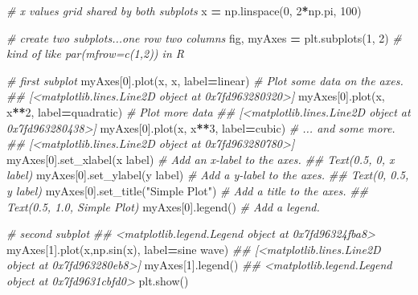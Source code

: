 \documentclass[
  12pt,
  krantz2]{krantz}
\makeatletter
\newenvironment{Shaded}{\begin{snugshade}}{\end{snugshade}}
\newcommand{\CommentTok}[1]{\textcolor[rgb]{0.37,0.37,0.37}{\textit{#1}}}
\newcommand{\DecValTok}[1]{\textcolor[rgb]{0.06,0.06,0.06}{#1}}
\newcommand{\NormalTok}[1]{#1}
\newcommand{\OperatorTok}[1]{\textcolor[rgb]{0.43,0.43,0.43}{\textbf{#1}}}
\newcommand{\StringTok}[1]{\textcolor[rgb]{0.5,0.5,0.5}{#1}}
\newenvironment{kframe}{%
\medskip{}
\setlength{\fboxsep}{.8em}
 \def\at@end@of@kframe{}%
 \ifinner\ifhmode%
  \def\at@end@of@kframe{\end{minipage}}%
  \begin{minipage}{\columnwidth}%
 \fi\fi%
 \def\FrameCommand##1{\hskip\@totalleftmargin \hskip-\fboxsep
 \colorbox{shadecolor}{##1}\hskip-\fboxsep
     \hskip-\linewidth \hskip-\@totalleftmargin \hskip\columnwidth}%
 \MakeFramed {\advance\hsize-\width
   \@totalleftmargin\z@ \linewidth\hsize
   \@setminipage}}%
 {\par\unskip\endMakeFramed%
 \at@end@of@kframe}
\renewenvironment{Shaded}{\begin{kframe}}{\end{kframe}}
\makeatother
\begin{document}
\begin{Shaded}
\begin{Highlighting}[]
\CommentTok{\# x values grid shared by both subplots}
\NormalTok{x }\OperatorTok{=}\NormalTok{ np.linspace(}\DecValTok{0}\NormalTok{, }\DecValTok{2}\OperatorTok{*}\NormalTok{np.pi, }\DecValTok{100}\NormalTok{) }

\CommentTok{\# create two subplots...one row two columns}
\NormalTok{fig, myAxes }\OperatorTok{=}\NormalTok{ plt.subplots(}\DecValTok{1}\NormalTok{, }\DecValTok{2}\NormalTok{) }\CommentTok{\# kind of like par(mfrow=c(1,2)) in R}

\CommentTok{\# first subplot}
\NormalTok{myAxes[}\DecValTok{0}\NormalTok{].plot(x, x, label}\OperatorTok{=}\StringTok{\textquotesingle{}linear\textquotesingle{}}\NormalTok{)  }\CommentTok{\# Plot some data on the axes.}
\CommentTok{\#\# [\textless{}matplotlib.lines.Line2D object at 0x7fd963280320\textgreater{}]}
\NormalTok{myAxes[}\DecValTok{0}\NormalTok{].plot(x, x}\OperatorTok{**}\DecValTok{2}\NormalTok{, label}\OperatorTok{=}\StringTok{\textquotesingle{}quadratic\textquotesingle{}}\NormalTok{)  }\CommentTok{\# Plot more data }
\CommentTok{\#\# [\textless{}matplotlib.lines.Line2D object at 0x7fd963280438\textgreater{}]}
\NormalTok{myAxes[}\DecValTok{0}\NormalTok{].plot(x, x}\OperatorTok{**}\DecValTok{3}\NormalTok{, label}\OperatorTok{=}\StringTok{\textquotesingle{}cubic\textquotesingle{}}\NormalTok{)  }\CommentTok{\# ... and some more.}
\CommentTok{\#\# [\textless{}matplotlib.lines.Line2D object at 0x7fd963280780\textgreater{}]}
\NormalTok{myAxes[}\DecValTok{0}\NormalTok{].set\_xlabel(}\StringTok{\textquotesingle{}x label\textquotesingle{}}\NormalTok{)  }\CommentTok{\# Add an x{-}label to the axes.}
\CommentTok{\#\# Text(0.5, 0, \textquotesingle{}x label\textquotesingle{})}
\NormalTok{myAxes[}\DecValTok{0}\NormalTok{].set\_ylabel(}\StringTok{\textquotesingle{}y label\textquotesingle{}}\NormalTok{)  }\CommentTok{\# Add a y{-}label to the axes.}
\CommentTok{\#\# Text(0, 0.5, \textquotesingle{}y label\textquotesingle{})}
\NormalTok{myAxes[}\DecValTok{0}\NormalTok{].set\_title(}\StringTok{"Simple Plot"}\NormalTok{)  }\CommentTok{\# Add a title to the axes.}
\CommentTok{\#\# Text(0.5, 1.0, \textquotesingle{}Simple Plot\textquotesingle{})}
\NormalTok{myAxes[}\DecValTok{0}\NormalTok{].legend()  }\CommentTok{\# Add a legend.}

\CommentTok{\# second subplot}
\CommentTok{\#\# \textless{}matplotlib.legend.Legend object at 0x7fd96324fba8\textgreater{}}
\NormalTok{myAxes[}\DecValTok{1}\NormalTok{].plot(x,np.sin(x), label}\OperatorTok{=}\StringTok{\textquotesingle{}sine wave\textquotesingle{}}\NormalTok{)}
\CommentTok{\#\# [\textless{}matplotlib.lines.Line2D object at 0x7fd963280eb8\textgreater{}]}
\NormalTok{myAxes[}\DecValTok{1}\NormalTok{].legend()}
\CommentTok{\#\# \textless{}matplotlib.legend.Legend object at 0x7fd9631cbfd0\textgreater{}}
\NormalTok{plt.show()}
\end{Highlighting}
\end{Shaded}
\end{document}
